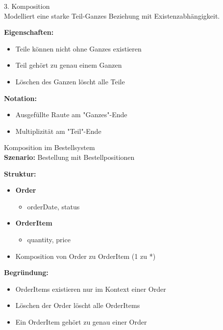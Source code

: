 \begin{concept}{3. Komposition}\\
Modelliert eine starke Teil-Ganzes Beziehung mit Existenzabhängigkeit.

\textbf{Eigenschaften:}
\begin{itemize}
    \item Teile können nicht ohne Ganzes existieren
    \item Teil gehört zu genau einem Ganzen
    \item Löschen des Ganzen löscht alle Teile
\end{itemize}

\textbf{Notation:}
\begin{itemize}
    \item Ausgefüllte Raute am "Ganzes"-Ende
    \item Multiplizität am "Teil"-Ende
\end{itemize}
\end{concept}

\begin{example2}{Komposition im Bestellsystem}\\
\textbf{Szenario:} Bestellung mit Bestellpositionen

\textbf{Struktur:}
\begin{itemize}
    \item \textbf{Order}
    \begin{itemize}
        \item orderDate, status
    \end{itemize}
    \item \textbf{OrderItem}
    \begin{itemize}
        \item quantity, price
    \end{itemize}
    \item Komposition von Order zu OrderItem (1 zu *)
\end{itemize}

\textbf{Begründung:}
\begin{itemize}
    \item OrderItems existieren nur im Kontext einer Order
    \item Löschen der Order löscht alle OrderItems
    \item Ein OrderItem gehört zu genau einer Order
\end{itemize}
\end{example2}


